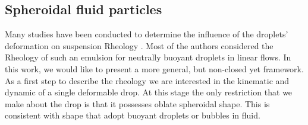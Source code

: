 \subsection{Spheroidal fluid particles}

Many studies have been conducted to determine the influence of the droplets' deformation on suspension Rheology \citet{goddard1967nonlinear,lhuillier1987phenomenology,maffettone1998equation}.
Most of the authors considered the Rheology of such an emulsion for neutrally buoyant droplets in linear flows. 
In this work, we would like to present a more general, but non-closed yet framework. 
As a first step to describe the rheology we are interested in the kinematic and dynamic of a single deformable drop. 
At this stage the only restriction that we make about the drop is that it possesses oblate spheroidal shape. 
This is consistent with shape that adopt buoyant droplets or bubbles in fluid. 

